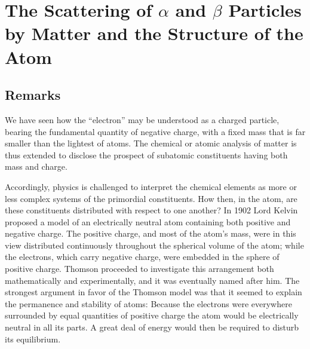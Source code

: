 \chapter{The Scattering of $\alpha$ and $\beta$ Particles by Matter and the Structure of the Atom}



\section*{Remarks}

We have seen how the ``electron'' may be understood as a charged
particle, bearing the fundamental quantity of negative charge, with a
fixed mass that is far smaller than the lightest of atoms. The chemical
or atomic analysis of matter is thus extended to disclose the prospect
of subatomic constituents having both mass and charge.

Accordingly, physics is challenged to interpret the chemical elements as
more or less complex systems of the primordial constituents. How then,
in the atom, are these constituents distributed with respect to one
another? In 1902 Lord Kelvin proposed a model of an electrically neutral
atom containing both positive and negative charge. The positive charge,
and most of the atom's mass, were in this view distributed continuously
throughout the spherical volume of the atom; while the electrons, which
carry negative charge, were embedded in the sphere of positive charge.
Thomson proceeded to investigate this arrangement both mathematically
and experimentally, and it was eventually named after him. The strongest
argument in favor of the Thomson model was that it seemed to explain the
permanence and stability of atoms: Because the electrons were everywhere
surrounded by equal quantities of positive charge the atom would be
electrically neutral in all its parts. A great deal of energy would then
be required to disturb its equilibrium.

